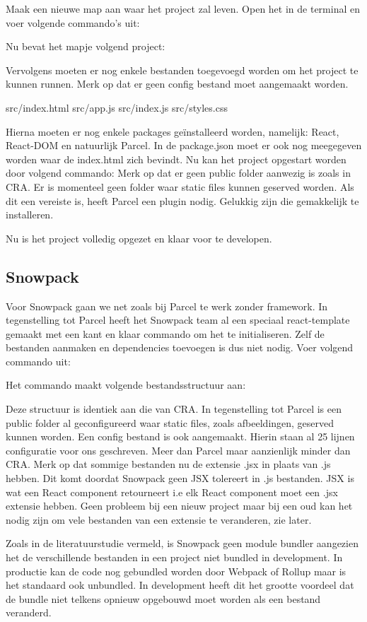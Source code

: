 Maak een nieuwe map aan waar het project zal leven. Open het in de terminal en voer volgende commando’s uit:

Nu bevat het mapje volgend project:

Vervolgens moeten er nog enkele bestanden toegevoegd worden om het project te kunnen runnen. Merk op dat er geen config bestand moet aangemaakt worden.

src/index.html
src/app.js
src/index.js
src/styles.css

Hierna moeten er nog enkele packages geïnstalleerd worden, namelijk: React, React-DOM en natuurlijk Parcel. In de package.json moet er ook nog meegegeven worden waar de index.html zich bevindt. Nu kan het project opgestart worden door volgend commando:
Merk op dat er geen public folder aanwezig is zoals in CRA. Er is momenteel geen folder waar static files kunnen geserved worden. Als dit een vereiste is, heeft Parcel een plugin nodig. Gelukkig zijn die gemakkelijk te installeren.

Nu is het project volledig opgezet en klaar voor te developen.

\subsection{Snowpack}
Voor Snowpack gaan we net zoals bij Parcel te werk zonder framework. In tegenstelling tot Parcel heeft het Snowpack team al een speciaal react-template gemaakt met een kant en klaar commando om het te initialiseren. Zelf de bestanden aanmaken en dependencies toevoegen is dus niet nodig. Voer volgend commando uit:

Het commando maakt volgende bestandsstructuur aan:

Deze structuur is identiek aan die van CRA. In tegenstelling tot Parcel is een public folder al geconfigureerd waar static files, zoals afbeeldingen, geserved kunnen worden. Een config bestand is ook aangemaakt. Hierin staan al 25 lijnen configuratie voor ons geschreven. Meer dan Parcel maar aanzienlijk minder dan CRA. Merk op dat sommige bestanden nu de extensie .jsx in plaats van .js hebben. Dit komt doordat Snowpack geen JSX tolereert in .js bestanden. JSX is wat een React component retourneert i.e elk React component moet een .jsx extensie hebben. Geen probleem bij een nieuw project maar bij een oud kan het nodig zijn om vele bestanden van een extensie te veranderen, zie later.

Zoals in de literatuurstudie vermeld, is Snowpack geen module bundler aangezien het de verschillende bestanden in een project niet bundled in development. In productie kan de code nog gebundled worden door Webpack of Rollup maar is het standaard ook unbundled. In development heeft dit het grootte voordeel dat de bundle niet telkens opnieuw opgebouwd moet worden als een bestand veranderd. 

